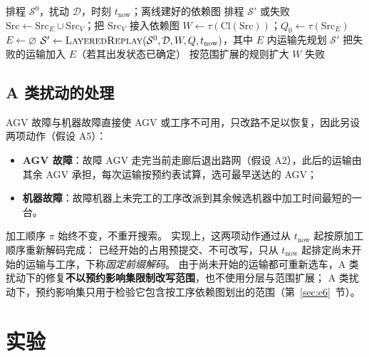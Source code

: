 \documentclass[manuscript,screen,review]{acmart}
\begin{document}
\begin{algorithm}[t]
\caption{分层有界修复（划界 + 分层回放 + 失败后放宽）}
\label{alg:strc_repair}
\begin{algorithmic}[1]
\Require 排程 \(\mathcal{S}^0\)，扰动 \(\mathcal{D}\)，时刻 \(t_{\mathrm{now}}\)；离线建好的依赖图
\Ensure 排程 \(\mathcal{S}'\) 或失败
\State \(\mathrm{Src}\gets\mathrm{Src}_E\cup\mathrm{Src}_V\)；把 \(\mathrm{Src}_V\) 接入依赖图
\State \(W \gets \tau(\mathrm{Cl}(\mathrm{Src}))\)；\(Q_0\gets\tau(\mathrm{Src}_E)\)
   
    \State \(E\gets\varnothing\)
    \Repeat
      \State \(\mathcal{S}' \gets \textsc{LayeredReplay}(\mathcal{S}^0,\mathcal{D},W,Q,t_{\mathrm{now}})\)，其中 \(E\) 内运输先规划
        \State \Return \(\mathcal{S}'\)
      \EndIf
      \State 把失败的运输加入 \(E\)（若其出发状态已确定）
  \EndFor
  \State 按范围扩展的规则扩大 \(W\) 
\EndFor
\State \Return 失败
\end{algorithmic}
\end{algorithm}

\subsection{A 类扰动的处理}
\label{sec:afault}

AGV 故障与机器故障直接使 AGV 或工序不可用，只改路不足以恢复，因此另设两项动作（假设 A5）：
\begin{itemize}[leftmargin=1.5em,itemsep=0.15em]
\item \textbf{AGV 故障}：故障 AGV 走完当前走廊后退出路网（假设 A2），此后的运输由其余 AGV 承担，每次运输按预约表试算，选可最早送达的 AGV；
\item \textbf{机器故障}：故障机器上未完工的工序改派到其余候选机器中加工时间最短的一台。
\end{itemize}
加工顺序 \(\pi\) 始终不变，不重开搜索。
实现上，这两项动作通过从 \(t_{\mathrm{now}}\) 起按原加工顺序重新解码完成：
已经开始的占用预提交、不可改写，只从 \(t_{\mathrm{now}}\) 起排定尚未开始的运输与工序，下称\emph{固定前缀解码}。
由于尚未开始的运输都可重新选车，A 类扰动下的修复\textbf{不以预约影响集限制改写范围}，也不使用分层与范围扩展；
A 类扰动下，预约影响集只用于检验它包含按工序依赖图划出的范围（第~\ref{sec:e6}~节）。


\section{实验}
\label{sec:experiments}
\end{document}
